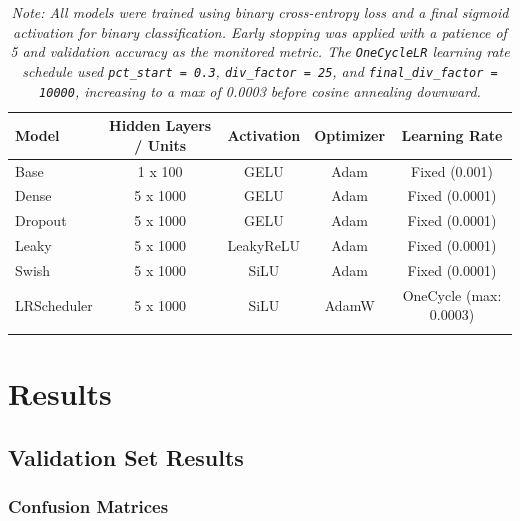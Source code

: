 \documentclass{article}      %
\begin{document}
\begin{table}[H]
    \centering
    \caption{Neural Network Configuration by Model}
    \begin{tabular}{lcccc}
    \arrayrulecolor{black}
    \toprule
    \textbf{Model} & \textbf{Hidden Layers / Units} & \textbf{Activation} & \textbf{Optimizer} & \textbf{Learning Rate} \\
    \midrule
    \arrayrulecolor{lightgray}
    Base             & 1 x 100      & GELU   & Adam   & Fixed (0.001) \\ \hline
    Dense            & 5 x 1000     & GELU   & Adam   & Fixed (0.0001) \\ \hline
    Dropout          & 5 x 1000     & GELU   & Adam   & Fixed (0.0001) \\ \hline
    Leaky            & 5 x 1000     & LeakyReLU & Adam & Fixed (0.0001) \\ \hline
    Swish            & 5 x 1000     & SiLU   & Adam & Fixed (0.0001) \\ \hline
    LRScheduler      & 5 x 1000     & SiLU   & AdamW & OneCycle (max: 0.0003) \\
    \arrayrulecolor{black}
    \bottomrule
    \end{tabular}
    \vspace{0.5em}
    \caption*{\small\textit{Note: All models were trained using binary cross-entropy loss and a final sigmoid activation for binary classification. Early stopping was applied with a patience of 5 and validation accuracy as the monitored metric. The \texttt{OneCycleLR} learning rate schedule used \texttt{pct\_start = 0.3}, \texttt{div\_factor = 25}, and \texttt{final\_div\_factor = 10000}, increasing to a max of 0.0003 before cosine annealing downward.}}
    \label{table:model_configurations}
\end{table}

\section{Results}

\subsection{Validation Set Results}

\subsubsection{Confusion Matrices}
\end{document}
